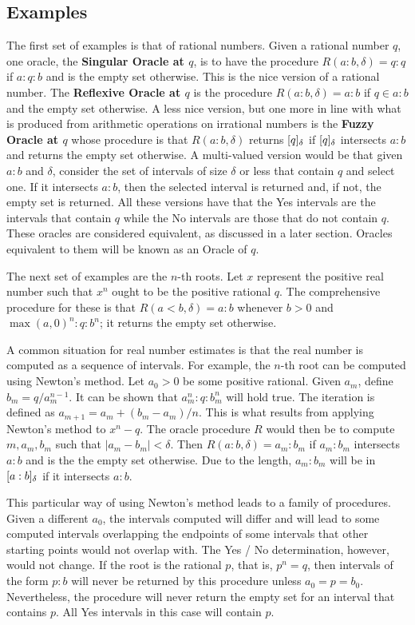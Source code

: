 \documentclass[12pt]{article}
\begin{document}
\subsection{Examples}

The first set of examples is that of rational numbers. Given a rational number $q$, one oracle, the \textbf{Singular Oracle at $q$}, is to have the procedure $R(a:b, \delta) = q:q$ if $a:q:b$ and is the empty set otherwise. This is the nice version of a rational number. The \textbf{Reflexive Oracle at $q$} is the procedure $R(a:b, \delta) = a:b$ if $q \in a:b$ and the empty set otherwise. A less nice version, but one more in line with what is produced from arithmetic operations on irrational numbers is the \textbf{Fuzzy Oracle at $q$} whose procedure is that $R(a:b, \delta)$ returns $[q]_{\delta}$ if $[q]_{\delta}$ intersects $a:b$ and returns the empty set otherwise. A multi-valued version would be that given $a:b$ and $\delta$, consider the set of intervals of size $\delta$ or less that contain $q$ and select one. If it intersects $a:b$, then the selected interval is returned and, if not, the empty set is returned. All these versions have that the Yes intervals are the intervals that contain $q$ while the No intervals are those that do not contain $q$. These oracles are considered equivalent, as discussed in a later section. Oracles equivalent to them will be known as an Oracle of $q$.  

The next set of examples are the $n$-th roots. Let $x$ represent the positive real number such that $x^n$ ought to be the positive rational $q$. The comprehensive procedure for these is that $R(a\lt b, \delta) = a:b$ whenever $b > 0$ and $\max(a, 0)^n:q:b^n$; it returns the empty set otherwise.

A common situation for real number estimates is that the real number is computed as a sequence of intervals. For example, the $n$-th root can be computed using Newton's method. Let $a_0 >0$ be some positive rational. Given $a_m$, define $b_m = q/a_m^{n-1}$. It can be shown that $a_m^n : q : b_m^n$ will hold true. The iteration is defined as $a_{m+1} = a_m + (b_m - a_m)/n$. This is what results from applying Newton's method to $x^n - q$. The oracle procedure $R$ would then be to compute $m, a_m, b_m$ such that $|a_m - b_m| < \delta$.  Then $R(a:b, \delta) = a_m:b_m$ if $a_m:b_m$ intersects $a:b$ and is the the empty set otherwise. Due to the length, $a_m:b_m$ will be in $[a:b]_{\delta}$ if it intersects $a:b$. 

This particular way of using Newton's method leads to a family of procedures. Given a different $a_0$, the intervals computed will differ and will lead to some computed intervals overlapping the endpoints of some intervals that other starting points would not overlap with. The Yes / No determination, however, would not  change. If the root is the rational $p$, that is, $p^n = q$,  then intervals of the form $p:b$ will never be returned by this procedure unless $a_0 = p = b_0$. Nevertheless, the procedure will never return the empty set for an interval that contains $p$. All Yes intervals in this case will contain $p$. 
\end{document}

